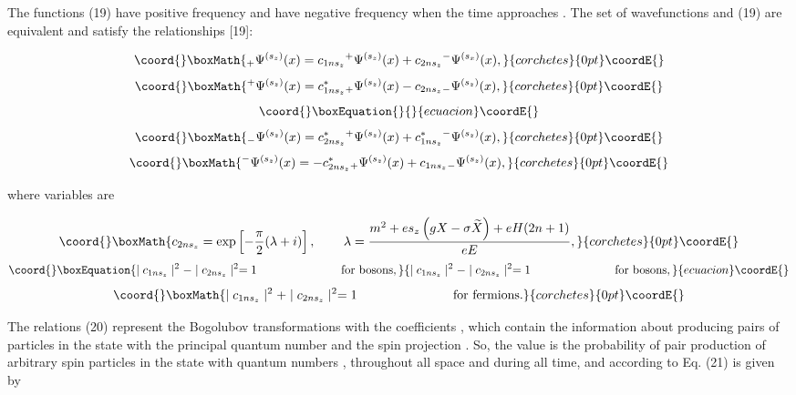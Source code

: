 \documentclass[a4paper,12pt]{article}
\begin{document}
The functions \coordHE{} (19) have positive frequency
and \coordHE{} have negative frequency when the time
approaches \myHighlight{$\pm \infty $}\coordHE{}. The set of wavefunctions \coordHE{} and \coordHE{} (19) are equivalent and satisfy the
relationships [19]:

\[\coord{}\boxMath{
_{+}\Psi ^{(s_z)}(x)=c_{1ns_z}{}^{+}\Psi ^{(s_z)}(x)+c_{2ns_z}{}^{-}\Psi
^{(s_x)}(x),
}{corchetes}{0pt}\coordE{}\]
\[\coord{}\boxMath{
^{+}\Psi ^{(s_z)}(x)=c_{1ns_z}^{*}{}_{+}\Psi ^{(s_z)}(x)-c_{2ns_z}{}_{-}\Psi
^{(s_z)}(x),
}{corchetes}{0pt}\coordE{}\]
\vspace{-8mm}
\begin{equation}\coord{}\boxEquation{  \label{20}
}{  }{ecuacion}\coordE{}\end{equation}
\vspace{-8mm}
\[\coord{}\boxMath{
_{-}\Psi ^{(s_z)}(x)=c_{2ns_z}^{*}{}^{+}\Psi
^{(s_z)}(x)+c_{1ns_z}^{*}{}^{-}\Psi ^{(s_z)}(x),
}{corchetes}{0pt}\coordE{}\]
\[\coord{}\boxMath{
^{-}\Psi ^{(s_z)}(x)=-c_{2ns_z}^{*}{}_{+}\Psi
^{(s_z)}(x)+c_{1ns_z}{}_{-}\Psi ^{(s_z)}(x),
}{corchetes}{0pt}\coordE{}\]

where variables \coordHE{}  \coordHE{} are

\[\coord{}\boxMath{
c_{2ns_z}=\exp \left[ -\frac \pi 2(\lambda +i)\right] ,\hspace{0.3in}\lambda
=\frac{m^2+es_z\left( gX-\sigma \widetilde{X}\right) +eH(2n+1)}{eE},
}{corchetes}{0pt}\coordE{}\]
\begin{equation}\coord{}\boxEquation{
\mid c_{1ns_z}\mid ^2-\mid c_{2ns_z}\mid
^2=1\hspace{1.0in}\mbox{for~bosons},  \label{21}
}{
\mid c_{1ns_z}\mid ^2-\mid c_{2ns_z}\mid
^2=1\hspace{1.0in}\mbox{for~bosons},  }{ecuacion}\coordE{}\end{equation}
\[\coord{}\boxMath{
\mid c_{1ns_z}\mid ^2+\mid c_{2ns_z}\mid ^2=1\hspace{1.0in}\mbox{
for~fermions}.
}{corchetes}{0pt}\coordE{}\]

The relations (20) represent the Bogolubov transformations with
the coefficients \coordHE{}, \coordHE{} which contain the
information about producing pairs of particles in the state with
the principal quantum number \coordHE{} and the spin projection \coordHE{}.
So, the value \coordHE{} is the probability of pair
production of arbitrary spin particles in the state with quantum
numbers \coordHE{}, \coordHE{} throughout all space and during all time, and
according to Eq. (21) is given by
\end{document}
